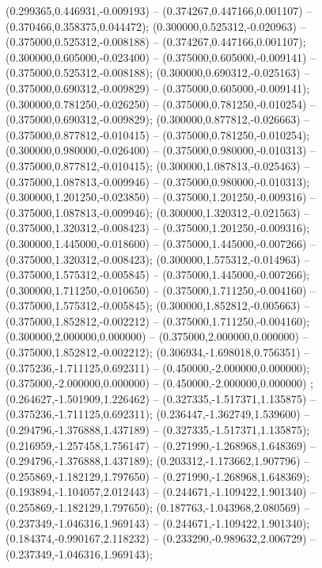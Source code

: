  (0.299365,0.446931,-0.009193) -- (0.374267,0.447166,0.001107) -- (0.370466,0.358375,0.044472);
 (0.300000,0.525312,-0.020963) -- (0.375000,0.525312,-0.008188) -- (0.374267,0.447166,0.001107);
 (0.300000,0.605000,-0.023400) -- (0.375000,0.605000,-0.009141) -- (0.375000,0.525312,-0.008188);
 (0.300000,0.690312,-0.025163) -- (0.375000,0.690312,-0.009829) -- (0.375000,0.605000,-0.009141);
 (0.300000,0.781250,-0.026250) -- (0.375000,0.781250,-0.010254) -- (0.375000,0.690312,-0.009829);
 (0.300000,0.877812,-0.026663) -- (0.375000,0.877812,-0.010415) -- (0.375000,0.781250,-0.010254);
 (0.300000,0.980000,-0.026400) -- (0.375000,0.980000,-0.010313) -- (0.375000,0.877812,-0.010415);
 (0.300000,1.087813,-0.025463) -- (0.375000,1.087813,-0.009946) -- (0.375000,0.980000,-0.010313);
 (0.300000,1.201250,-0.023850) -- (0.375000,1.201250,-0.009316) -- (0.375000,1.087813,-0.009946);
 (0.300000,1.320312,-0.021563) -- (0.375000,1.320312,-0.008423) -- (0.375000,1.201250,-0.009316);
 (0.300000,1.445000,-0.018600) -- (0.375000,1.445000,-0.007266) -- (0.375000,1.320312,-0.008423);
 (0.300000,1.575312,-0.014963) -- (0.375000,1.575312,-0.005845) -- (0.375000,1.445000,-0.007266);
 (0.300000,1.711250,-0.010650) -- (0.375000,1.711250,-0.004160) -- (0.375000,1.575312,-0.005845);
 (0.300000,1.852812,-0.005663) -- (0.375000,1.852812,-0.002212) -- (0.375000,1.711250,-0.004160);
 (0.300000,2.000000,0.000000) -- (0.375000,2.000000,0.000000) -- (0.375000,1.852812,-0.002212);
 (0.306934,-1.698018,0.756351) -- (0.375236,-1.711125,0.692311) -- (0.450000,-2.000000,0.000000);
 (0.375000,-2.000000,0.000000) -- (0.450000,-2.000000,0.000000) ;
 (0.264627,-1.501909,1.226462) -- (0.327335,-1.517371,1.135875) -- (0.375236,-1.711125,0.692311);
 (0.236447,-1.362749,1.539600) -- (0.294796,-1.376888,1.437189) -- (0.327335,-1.517371,1.135875);
 (0.216959,-1.257458,1.756147) -- (0.271990,-1.268968,1.648369) -- (0.294796,-1.376888,1.437189);
 (0.203312,-1.173662,1.907796) -- (0.255869,-1.182129,1.797650) -- (0.271990,-1.268968,1.648369);
 (0.193894,-1.104057,2.012443) -- (0.244671,-1.109422,1.901340) -- (0.255869,-1.182129,1.797650);
 (0.187763,-1.043968,2.080569) -- (0.237349,-1.046316,1.969143) -- (0.244671,-1.109422,1.901340);
 (0.184374,-0.990167,2.118232) -- (0.233290,-0.989632,2.006729) -- (0.237349,-1.046316,1.969143);

